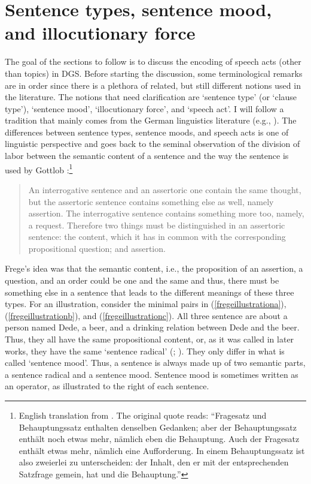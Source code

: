 
\section{Sentence types, sentence mood, and illocutionary force}\label{sec:speechacts}
The goal of the sections to follow is to discuss the encoding of speech acts (other than topics) in DGS. Before starting the discussion, some terminological remarks are in order since there is a plethora of related, but still different notions used in the literature. The notions that need clarification are `sentence type' (or `clause type'), `sentence mood', `illocutionary force', and `speech act'. I will follow a tradition that mainly comes from the German linguistics literature (e.g., \citealt{meibauer1987probleme, zaefferer1987satztypen, grewendorf1991theorien, brandt1992satztyp, zaefferer2006types, gutzmann2015use}). The differences between sentence types, sentence moods, and speech acts is one of linguistic perspective and goes back to the seminal observation of the division of labor between the semantic content of a sentence and the way the sentence is used by Gottlob  \citet[62]{frege1918gedanke}:\footnote{ English translation from \citet[329]{frege1997thought}. The original quote reads: ``Fragesatz und Behauptungssatz enthalten denselben Gedanken; aber der Behauptungssatz enthält noch etwas mehr, nämlich eben die Behauptung. Auch der Fragesatz enthält etwas mehr, nämlich eine Aufforderung. In einem Behauptungssatz ist also zweierlei zu unterscheiden: der Inhalt, den er mit der entsprechenden Satzfrage gemein, hat und die Behauptung.''}

\begin{quote}
An interrogative sentence and an assertoric one contain the same thought, but the assertoric sentence contains something else as well, namely assertion. The interrogative sentence contains something more too, namely, a request. Therefore two things must be distinguished in an assertoric sentence: the content, which it has in common with the corresponding propositional question; and assertion.
\end{quote}

\noindent Frege's idea was that the semantic content, i.e., the proposition of an assertion, a question, and an order could be one and the same and thus, there must be something else in a sentence that leads to the different meanings of these three types. For an illustration, consider the minimal pairs in (\ref{fregeillustrationa}), (\ref{fregeillustrationb}), and (\ref{fregeillustrationc}). All three sentence are about a person named Dede, a beer, and a drinking relation between Dede and the beer. Thus, they all have the same propositional content, or, as it was called in later works, they have the same `sentence radical' (\citealt[\S 22]{wittgenstein1953phil}; \citealt{stenius1967mood}). They only differ in what is called `sentence mood'. Thus, a sentence is always made up of two semantic parts, a sentence radical and a sentence mood. Sentence mood is sometimes written as an operator, as illustrated to the right of each sentence.


